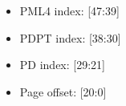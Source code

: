 \begin{parts}
    \begin{solution}
        \begin{itemize}
            \item PML4 index: [47:39]
            \item PDPT index: [38:30]
            \item PD index: [29:21]
            \item Page offset: [20:0]
        \end{itemize}
    \end{solution}


\end{parts}
